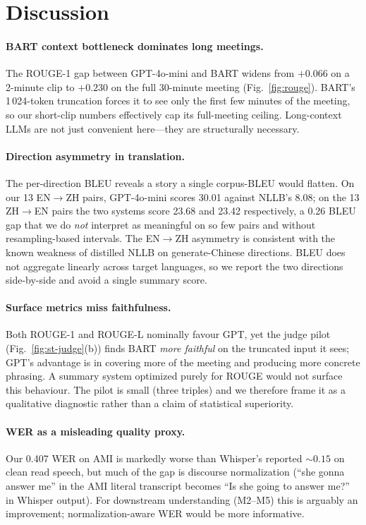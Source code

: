 \documentclass[11pt,a4paper]{article}
\begin{document}
\section{Discussion}
\label{sec:disc}

\paragraph{BART context bottleneck dominates long meetings.}
The ROUGE-1 gap between GPT-4o-mini and BART widens from $+0.066$
on a 2-minute clip to $+0.230$ on the full 30-minute meeting
(Fig.~\ref{fig:rouge}). BART's 1\,024-token truncation forces it to
see only the first few minutes of the meeting, so our short-clip
numbers effectively cap its full-meeting ceiling. Long-context LLMs
are not just convenient here---they are structurally necessary.

\paragraph{Direction asymmetry in translation.}
The per-direction BLEU reveals a story a single corpus-BLEU would
flatten. On our 13 EN$\to$ZH pairs, GPT-4o-mini scores 30.01 against
NLLB's 8.08; on the 13 ZH$\to$EN pairs the two systems score 23.68
and 23.42 respectively, a 0.26 BLEU gap that we do \emph{not}
interpret as meaningful on so few pairs and without resampling-based
intervals. The EN$\to$ZH asymmetry is consistent with the known
weakness of distilled NLLB on generate-Chinese directions. BLEU does
not aggregate linearly across target languages, so we report the two
directions side-by-side and avoid a single summary score.

\paragraph{Surface metrics miss faithfulness.}
Both ROUGE-1 and ROUGE-L nominally favour GPT, yet the judge pilot
(Fig.~\ref{fig:st-judge}(b)) finds BART \emph{more faithful} on the
truncated input it sees; GPT's advantage is in covering more of the
meeting and producing more concrete phrasing. A summary system
optimized purely for ROUGE would not surface this behaviour. The
pilot is small (three triples) and we therefore frame it as a
qualitative diagnostic rather than a claim of statistical superiority.

\paragraph{WER as a misleading quality proxy.}
Our 0.407 WER on AMI is markedly worse than Whisper's reported
${\sim}0.15$ on clean read speech, but much of the gap is discourse
normalization (``she gonna answer me'' in the AMI literal transcript
becomes ``Is she going to answer me?'' in Whisper output). For
downstream understanding (M2--M5) this is arguably an improvement;
normalization-aware WER would be more informative.
\end{document}
